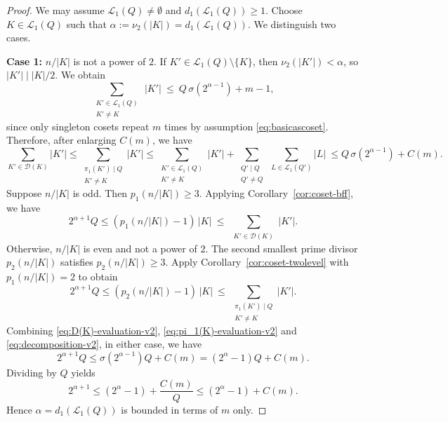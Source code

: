 \documentclass[11pt,reqno]{amsart}
\theoremstyle{definition}
\newcommand{\Lset}{\mathcal{L}}
\newcommand{\Dset}{\mathcal{D}}
\begin{document}
\begin{proof}
We may assume \(\Lset_1(Q)\neq\emptyset\) and
\(d_1(\Lset_1(Q))\ge1\). Choose \(K\in\Lset_1(Q)\) such that
\(\alpha := \nu_2(|K|)=d_1(\Lset_1(Q))\). We distinguish two cases.

\smallskip\noindent\textbf{Case 1: } \(n/|K|\) is not a power of \(2\). If \(K'\in \Lset_1(Q)\setminus\{K\}\), then 
\(\nu_2(|K'|)<\alpha \), so \(|K'|\mid |K|/2\).
We obtain
\[
\sum_{\substack{K' \in \Lset_1(Q) \\ K'\neq K}}\ |K'|
\ \le\
Q\,\sigma\!\left(2^{\alpha-1}\right) + m - 1,
\]
since only singleton cosets repeat \(m\) times by assumption \eqref{eq:basicascoset}.
Therefore, after enlarging \(C(m)\), we have
\begin{equation}
\label{eq:decomposition-v2}
\sum_{K'\in\Dset(K)} |K'|
\le
\sum_{\substack{\pi_1(K')\mid Q \\ K'\neq K}} |K'|
\le
\sum_{\substack{K' \in \Lset_1(Q) \\ K'\neq K}} |K'| +\sum_{\substack{Q'\mid Q\\ Q'\neq Q}}\ \sum_{L\in\Lset_1(Q')} |L|\
\le
Q\,\sigma\!\left(2^{\alpha-1}\right) + C(m).
\end{equation}
Suppose \(n/|K|\) is odd. Then \(p_1(n/|K|) \ge 3\). Applying
 Corollary~\ref{cor:coset-bff}, we have 
\begin{equation}
\label{eq:D(K)-evaluation-v2}
  2^{\alpha+1}Q \le (p_1(n/|K|)-1)\,|K|
  \ \le\
  \sum_{\substack{K' \in \Dset(K)}} |K'|.
\end{equation}
Otherwise, \(n/|K|\) is even and not a power of \(2\). The second smallest prime divisor
\(p_2(n/|K|)\) satisfies \(p_2(n/|K|)\ge3\).
Apply Corollary~\ref{cor:coset-twolevel} with \(p_1(n/|K|)=2\) to obtain
\begin{equation}\label{eq:pi_1(K)-evaluation-v2}
2^{\alpha+1}Q \le
  (p_2(n/|K|)-1)\,|K|
  \ \le\
  \sum_{\substack{\pi_1(K')\mid Q \\ K'\neq K}} |K'|.
\end{equation}
Combining \eqref{eq:D(K)-evaluation-v2}, \eqref{eq:pi_1(K)-evaluation-v2} and \eqref{eq:decomposition-v2}, in either case, we have
\[
2^{\alpha+1}Q\le \sigma\!\left(2^{\alpha-1}\right)Q + C(m)
= (2^\alpha-1)Q +  C(m).
\]
Dividing by \(Q\) yields
\[
2^{\alpha+1}\le (2^\alpha-1)+\frac{C(m)}{Q}
\le 
(2^\alpha-1)+C(m).\]
Hence \(\alpha=d_1(\Lset_1(Q))\) is bounded in terms of \(m\) only.


\end{proof}
\end{document}
